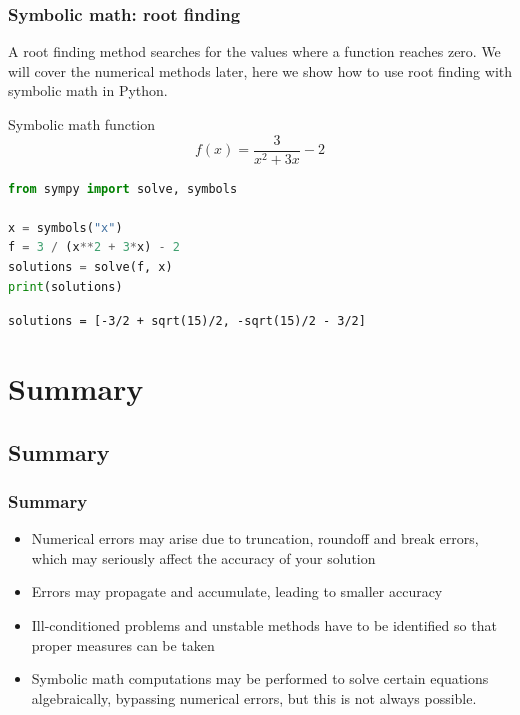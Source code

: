 {\nologo
\begin{frame}[fragile]
  \frametitle{Symbolic math: root finding }
  A root finding method searches for the values where a function reaches zero. We will cover the numerical methods later, here we show how to use root finding with symbolic math in Python.
   \begin{block}{Symbolic math function}
  \[ f(x) =   \frac{3}{x^2 + 3x} - 2 \]
  \pause
  \begin{lstlisting}[language=Python]
from sympy import solve, symbols

x = symbols("x")
f = 3 / (x**2 + 3*x) - 2
solutions = solve(f, x)
print(solutions)
  \end{lstlisting}
  \end{block}
  \pause
  \texttt{solutions = [-3/2 + sqrt(15)/2, -sqrt(15)/2 - 3/2]}
\end{frame}
}



\section{Summary}
\subsection*{Summary}
\begin{frame}
  \frametitle{Summary}
  \begin{itemize}
     \item Numerical errors may arise due to truncation, roundoff and break errors, which may seriously affect the accuracy of your solution
     \item Errors may propagate and accumulate, leading to smaller accuracy
     \item Ill-conditioned problems and unstable methods have to be identified so that proper measures can be taken
     \item Symbolic math computations may be performed to solve certain equations algebraically, bypassing numerical errors, but this is not always possible.
  \end{itemize}

\end{frame}



